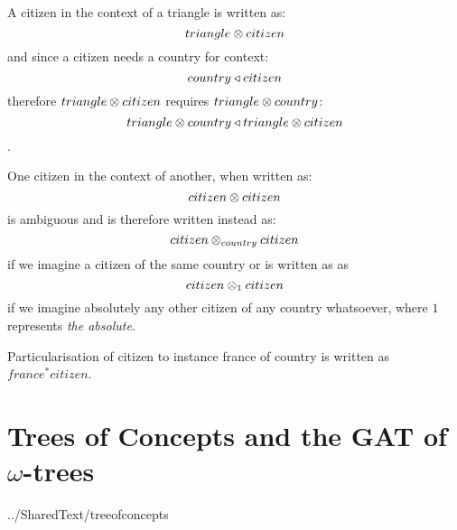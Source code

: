 \documentclass[10pt,a4paper]{article}
\begin{document}
A citizen in the context of a triangle is written as:
$$
triangle \otimes citizen
$$
and since a citizen needs a country for context:
$$
country \triangleleft citizen
$$
 therefore $triangle \otimes citizen$ requires $triangle \otimes country$:
$$ triangle \otimes country \triangleleft triangle \otimes citizen$$.


One citizen in the context of another, when written as:
$$citizen \otimes citizen$$
is ambiguous and is therefore written instead as:
$$citizen \otimes_{country} citizen$$
if we imagine a citizen of the same country or is written as as
$$citizen \otimes_1 citizen$$
if we imagine absolutely any other citizen of any country whatsoever, 
where $1$ represents \textit{the absolute}. 

Particularisation of  citizen to instance france of country is written as
$france^*citizen$.



\section{Trees of Concepts and the GAT of $\omega$-trees}
 {../SharedText/treeofconcepts}



\end{document}
